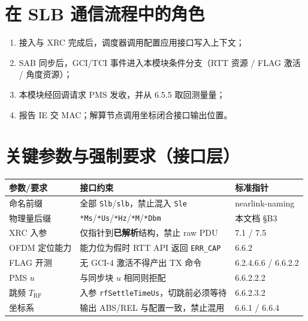 \documentclass[11pt,a4paper]{ctexart}
\begin{document}
\section{在 SLB 通信流程中的角色}

\begin{enumerate}[nosep]
  \item 接入与 XRC 完成后，调度器调用配置应用接口写入上下文；
  \item SAB 同步后，GCI/TCI 事件进入本模块条件分支（RTT 资源 / FLAG 激活 / 角度资源）；
  \item 本模块经回调请求 PMS 发收，并从 6.5.5 取回测量量；
  \item 报告 IE 交 MAC；解算节点调用坐标闭合接口输出位置。
\end{enumerate}

\section{关键参数与强制要求（接口层）}

\begin{table}[h]
\centering
\small
\begin{tabular}{L{3.4cm}L{4.8cm}L{4.8cm}}
\toprule
\textbf{参数/要求} & \textbf{接口约束} & \textbf{标准指针} \\
\midrule
命名前缀 & 全部 \texttt{Slb}/\texttt{slb}，禁止混入 \texttt{Sle} & nearlink-naming \\
物理量后缀 & \texttt{*Ms}/\texttt{*Us}/\texttt{*Hz}/\texttt{*M}/\texttt{*Dbm} & 本文档 §B3 \\
XRC 入参 & 仅指针到\textbf{已解析}结构，禁止 raw PDU & 7.1 / 7.5 \\
OFDM 定位能力 & 能力位为假时 RTT API 返回 \texttt{ERR\_CAP} & 6.6.2 \\
FLAG 开测 & 无 GCI-4 激活不得产出 TX 命令 & 6.2.4.6.6 / 6.6.2.2 \\
PMS $u$ & 与同步块 $u$ 相同则拒配 & 6.6.2.2.2 \\
跳频 $T_{\mathrm{RF}}$ & 入参 \texttt{rfSettleTimeUs}，切跳前必须等待 & 6.6.2.3.2 \\
坐标系 & 输出 ABS/REL 与配置一致，禁止混用 & 6.6.1 / 6.6.4 \\
\bottomrule
\end{tabular}
\end{table}

\end{document}
